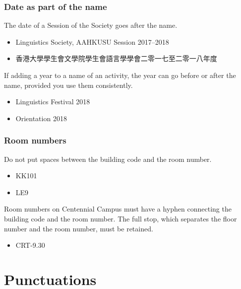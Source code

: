 \documentclass[11pt,a4paper]{book}
\newcommand{\cmark}{{\color{green(html/cssgreen)}\checkmark}}%
\begin{document}
			\subsection{Date as part of the name}
			The date of a Session of the Society goes after the name.
			{\firasans \begin{mdframed}[backgroundcolor=aliceblue] \begin{itemize}[label=\cmark]
				\item Linguistics Society, AAHKUSU Session 2017--2018
				\item 香港大學學生會文學院學生會語言學學會二零一七至二零一八年度
			\end{itemize} \end{mdframed} }
			If adding a year to a name of an activity, the year can go before or after the name, provided you use them consistently.
			{\firasans \begin{mdframed}[backgroundcolor=aliceblue] \begin{itemize}[label=\cmark]
				\item 	Linguistics Festival 2018
				\item Orientation 2018
			\end{itemize} \end{mdframed} }			
			\subsection{Room numbers}
			Do not put spaces between the building code and the room number.
			{\firasans \begin{mdframed}[backgroundcolor=aliceblue] \begin{itemize}[label=\cmark]
				\item KK101
				\item LE9
			\end{itemize} \end{mdframed} }
			Room numbers on Centennial Campus must have a hyphen connecting the building code and the room number. The full stop, which separates the floor number and the room number, must be retained.
			{\firasans \begin{mdframed}[backgroundcolor=aliceblue] \begin{itemize}[label=\cmark]
				\item CRT-9.30
			\end{itemize} \end{mdframed} }
		\chapter{Punctuations}
\end{document}
